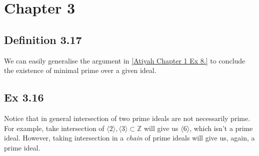 \section{Chapter 3}

\subsection{Definition 3.17}

We can easily generalise the argument in \ref{Atiyah Chapter 1 Ex 8.} to conclude the existence of minimal prime over a given ideal.

\subsection{Ex 3.16}
Notice that in general intersection of two prime ideals are not necessarily prime. For example, take intersection of $\langle 2\rangle,\langle 3\rangle\subset \mathbb Z$ will give us $\langle 6\rangle$, which isn't a prime ideal. However, taking intersection in a \textit{chain} of prime ideals will give us, again, a prime ideal. 